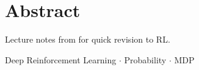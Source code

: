 \chapter*{Abstract}
Lecture notes from for quick revision to RL.

\mbox{}\linebreak
{} Deep Reinforcement Learning $\cdot$ Probability $\cdot$ MDP 
